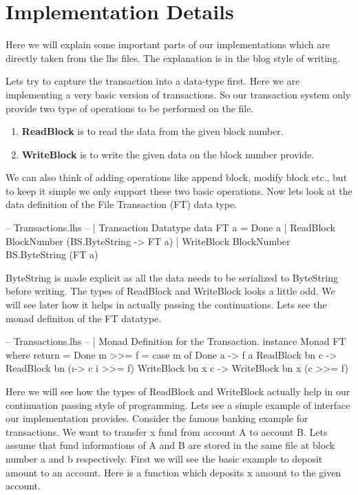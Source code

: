 \documentclass[11pt,a4paper]{article}
\begin{document}
\pagebreak
\section{Implementation Details}

Here we will explain some important parts of our implementations which are directly taken from the lhs files. The explanation is in the blog style of writing.

Lets try to capture the transaction into a data-type first. Here
we are implementing a very basic version of transactions. So our
transaction system only provide two type of operations to be performed
on the file.

\begin{enumerate}
\item \textbf{ReadBlock} is to read the data from the given block number.
\item \textbf{WriteBlock} is to write the given data on the block number provide.
\end{enumerate}

We can also think of adding operations like append block, modify block
etc., but to keep it simple we only support these two basic operations.
Now lets look at the data definition of the File Transaction (FT) data
type.

\begin{code}[name=Transactions]
-- Transactions.lhs
-- | Transaction Datatype
data FT a = 
    Done a | 
    ReadBlock BlockNumber (BS.ByteString -> FT a) | 
    WriteBlock BlockNumber BS.ByteString (FT a)
\end{code}

ByteString is made explicit as all the data needs to be serialized to ByteString before writing.
The types of ReadBlock and WriteBlock looks a little odd. We will see later how it helps in actually passing the continuations.
Lets see the monad definiton of the FT datatype.

\begin{code}[name=Transactions]
-- Transactions.lhs
-- | Monad Definition for the Transaction. 
instance Monad FT where 
    return = Done 
    m >>= f = case m of 
        Done a -> f a 
        ReadBlock bn c -> ReadBlock bn (\i -> c i  >>= f) 
        WriteBlock bn x c -> WriteBlock bn x (c >>= f)
\end{code}

Here we will see how the types of ReadBlock and WriteBlock actually help
in our continuation passing style of programming. Lets see a simple
example of interface our implementation provides.
Consider the famous banking example for transactions. We want to
transfer x fund from account A to account B.
Lets assume that fund informations of A and B are stored in the same
file at block number a and b respectively.
First we will see the basic example to deposit amount to an account. 
Here is a function which deposits x amount to the given account. 
\end{document}
